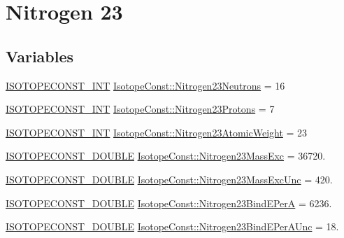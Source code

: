 \hypertarget{group___isotope_const-_nitrogen-_n23}{}\section{Nitrogen 23}
\label{group___isotope_const-_nitrogen-_n23}
\subsection*{Variables}
\begin{DoxyCompactItemize}
\item 
\mbox{\hyperlink{group___isotope_const-_macros_ga5f18360b3e99483a35c32d789e62621c}{I\+S\+O\+T\+O\+P\+E\+C\+O\+N\+S\+T\+\_\+\+I\+NT}} \mbox{\hyperlink{group___isotope_const-_nitrogen-_n23_ga7a46d22f2c20957379aaa9eeaeddd4d1}{Isotope\+Const\+::\+Nitrogen23\+Neutrons}} = 16
\item 
\mbox{\hyperlink{group___isotope_const-_macros_ga5f18360b3e99483a35c32d789e62621c}{I\+S\+O\+T\+O\+P\+E\+C\+O\+N\+S\+T\+\_\+\+I\+NT}} \mbox{\hyperlink{group___isotope_const-_nitrogen-_n23_gaf52f95afe3508784c4499870ad0332c9}{Isotope\+Const\+::\+Nitrogen23\+Protons}} = 7
\item 
\mbox{\hyperlink{group___isotope_const-_macros_ga5f18360b3e99483a35c32d789e62621c}{I\+S\+O\+T\+O\+P\+E\+C\+O\+N\+S\+T\+\_\+\+I\+NT}} \mbox{\hyperlink{group___isotope_const-_nitrogen-_n23_ga0733b733c3f5320029c60dbc1f1b4678}{Isotope\+Const\+::\+Nitrogen23\+Atomic\+Weight}} = 23
\item 
\mbox{\hyperlink{group___isotope_const-_macros_ga8f45a7272ce02c0b4c65c44636ed719a}{I\+S\+O\+T\+O\+P\+E\+C\+O\+N\+S\+T\+\_\+\+D\+O\+U\+B\+LE}} \mbox{\hyperlink{group___isotope_const-_nitrogen-_n23_ga0f0450d3f0539783ba3ea4b75d9c73c2}{Isotope\+Const\+::\+Nitrogen23\+Mass\+Exc}} = 36720.
\item 
\mbox{\hyperlink{group___isotope_const-_macros_ga8f45a7272ce02c0b4c65c44636ed719a}{I\+S\+O\+T\+O\+P\+E\+C\+O\+N\+S\+T\+\_\+\+D\+O\+U\+B\+LE}} \mbox{\hyperlink{group___isotope_const-_nitrogen-_n23_ga88e56795f0c7d4e8a3493c9cd590d99c}{Isotope\+Const\+::\+Nitrogen23\+Mass\+Exc\+Unc}} = 420.
\item 
\mbox{\hyperlink{group___isotope_const-_macros_ga8f45a7272ce02c0b4c65c44636ed719a}{I\+S\+O\+T\+O\+P\+E\+C\+O\+N\+S\+T\+\_\+\+D\+O\+U\+B\+LE}} \mbox{\hyperlink{group___isotope_const-_nitrogen-_n23_gac633a231638ce4c9c27a808fca039d11}{Isotope\+Const\+::\+Nitrogen23\+Bind\+E\+PerA}} = 6236.
\item 
\mbox{\hyperlink{group___isotope_const-_macros_ga8f45a7272ce02c0b4c65c44636ed719a}{I\+S\+O\+T\+O\+P\+E\+C\+O\+N\+S\+T\+\_\+\+D\+O\+U\+B\+LE}} \mbox{\hyperlink{group___isotope_const-_nitrogen-_n23_ga961ff1c6adae1ff3e2326552996060b8}{Isotope\+Const\+::\+Nitrogen23\+Bind\+E\+Per\+A\+Unc}} = 18.

\end{DoxyCompactItemize}
